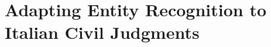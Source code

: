 \section[Adapting Entity Recognition to Italian Civil Judgments][Adapting ER to Italian Judgments]{Adapting Entity Recognition to Italian Civil Judgments}
\label{sec:adaptation}




